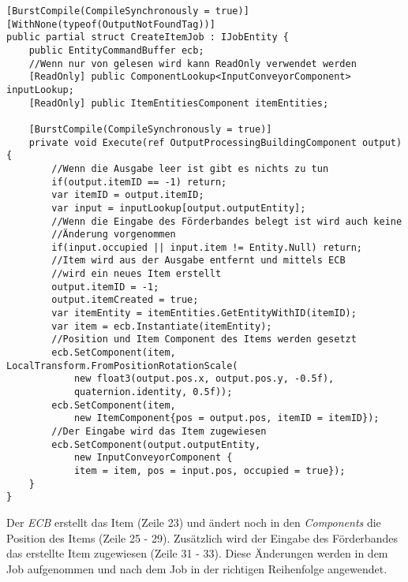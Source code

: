 \begin{lstlisting}[style=code, caption={[Job in dem ein \textit{ECB} verwendet wird]Job in dem ein \textit{ECB} verwendet wird. Der \textit{ECB} sammelt die Änderungen aus dem Job und spielt sie nach dem Job wieder ab.}, label=lstCreateItemJob]
[BurstCompile(CompileSynchronously = true)]
[WithNone(typeof(OutputNotFoundTag))]
public partial struct CreateItemJob : IJobEntity {
    public EntityCommandBuffer ecb;
    //Wenn nur von gelesen wird kann ReadOnly verwendet werden
    [ReadOnly] public ComponentLookup<InputConveyorComponent> inputLookup;
    [ReadOnly] public ItemEntitiesComponent itemEntities;

    [BurstCompile(CompileSynchronously = true)]
    private void Execute(ref OutputProcessingBuildingComponent output) {
        //Wenn die Ausgabe leer ist gibt es nichts zu tun
        if(output.itemID == -1) return;
        var itemID = output.itemID;
        var input = inputLookup[output.outputEntity];
        //Wenn die Eingabe des Förderbandes belegt ist wird auch keine
        //Änderung vorgenommen
        if(input.occupied || input.item != Entity.Null) return;
        //Item wird aus der Ausgabe entfernt und mittels ECB
        //wird ein neues Item erstellt 
        output.itemID = -1;
        output.itemCreated = true;
        var itemEntity = itemEntities.GetEntityWithID(itemID);
        var item = ecb.Instantiate(itemEntity);
        //Position und Item Component des Items werden gesetzt
        ecb.SetComponent(item, LocalTransform.FromPositionRotationScale(
            new float3(output.pos.x, output.pos.y, -0.5f),
            quaternion.identity, 0.5f));
        ecb.SetComponent(item,
            new ItemComponent{pos = output.pos, itemID = itemID});
        //Der Eingabe wird das Item zugewiesen
        ecb.SetComponent(output.outputEntity,
            new InputConveyorComponent {
            item = item, pos = input.pos, occupied = true});
    }
}
\end{lstlisting}
Der \textit{ECB} erstellt das Item (Zeile 23) und ändert noch in den \textit{Components} die Position des Items (Zeile 25 - 29). Zusätzlich wird der Eingabe des Förderbandes das erstellte Item zugewiesen (Zeile 31 - 33). Diese Änderungen werden in dem Job aufgenommen und nach dem Job in der richtigen Reihenfolge angewendet.